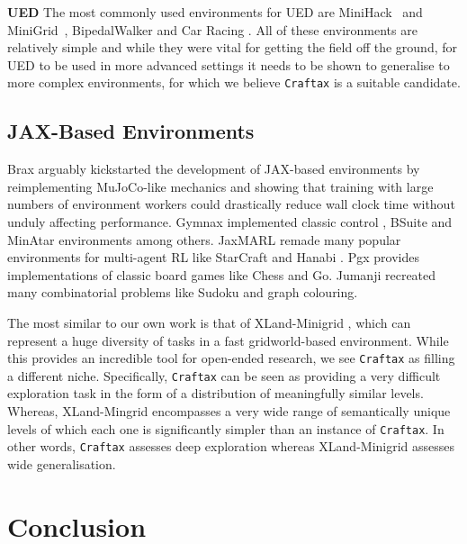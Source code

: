 \documentclass{article}
\theoremstyle{plain}
\theoremstyle{definition}
\theoremstyle{remark}
\begin{document}
\textbf{UED}  The most commonly used environments for UED are MiniHack~\citep{minihack2021samvelyan} and MiniGrid~\citep{MinigridMiniworld23}, BipedalWalker \citep{poet2019wang} and Car Racing \citep{jiang2021Replayguided}.  All of these environments are relatively simple and while they were vital for getting the field off the ground, for UED to be used in more advanced settings it needs to be shown to generalise to more complex environments, for which we believe \texttt{Craftax} is a suitable candidate.

\subsection{JAX-Based Environments}

Brax \citep{brax2021freeman} arguably kickstarted the development of JAX-based environments by reimplementing MuJoCo-like mechanics \citep{todorov2012mujoco} and showing that training with large numbers of environment workers could drastically reduce wall clock time without unduly affecting performance.  Gymnax \citep{gymnax2022github} implemented classic control \citep{brockman2016openai}, BSuite \citep{osband2020bsuite} and MinAtar environments \citep{young2019minatar} among others.  JaxMARL \citep{flair2023jaxmarl} remade many popular environments for multi-agent RL like StarCraft \citep{samvelyan2019starcraft, ellis2024smacv2} and Hanabi \citep{bard2020hanabi}.  Pgx \citep{koyamada2023pgx} provides implementations of classic board games like Chess and Go.  Jumanji \citep{bonnet2023jumanji} recreated many combinatorial problems like Sudoku and graph colouring.

The most similar to our own work is that of XLand-Minigrid \citep{nikulin2023xlandminigrid}, which can represent a huge diversity of tasks in a fast gridworld-based environment.  While this provides an incredible tool for open-ended research, we see \texttt{Craftax} as filling a different niche.  Specifically, \texttt{Craftax} can be seen as providing a very difficult exploration task in the form of a distribution of meaningfully similar levels.  Whereas, XLand-Mingrid encompasses a very wide range of semantically unique levels of which each one is significantly simpler than an instance of \texttt{Craftax}.  In other words, \texttt{Craftax} assesses deep exploration whereas XLand-Minigrid assesses wide generalisation.

\section{Conclusion}
\end{document}
